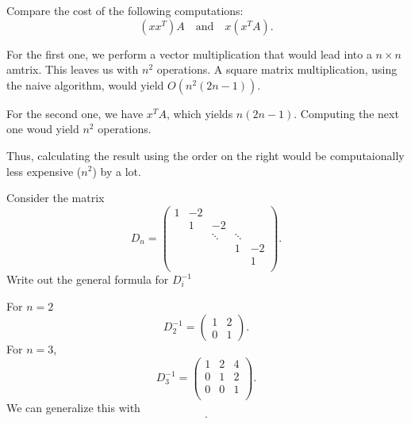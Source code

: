\documentclass[5pt, a4paper]{article}
\begin{document}
\begin{tcolorbox}[title=Question 1]
    Compare the cost of the following computations: \[
        (x x^{T})A \quad \text{and} \quad x(x^{T}A)
    .\] 
\end{tcolorbox}
For the first one, we perform a vector multiplication that would lead into a $n
\times n$ amtrix. This leaves us with $n^2$ operations. A square matrix
multiplication, using the naive algorithm, would yield $O(n^2(2n-1))$.

For the second one, we have $x^{T}A$, which yields $n(2n - 1)$. Computing the
next one woud yield $n^2$ operations. 

Thus, calculating the result using the order on the right would be
computaionally less expensive ($n^2$) by a lot.
\begin{tcolorbox}[title=Question 2]
    Consider the matrix \[
        D_n =
   \begin{pmatrix} 
       1 & -2 &  & &  \\
        & 1 & -2 & &  \\
        &  & \ddots & \ddots &  \\
        &  & & 1 & -2 \\
        &  & &  & 1 \\
   \end{pmatrix}  
    .\] 
    Write out the general formula for $D_i^{-1}$
\end{tcolorbox}
For $n = 2$
 \[
     D_2^{-1} = \begin{pmatrix} 1 & 2 \\ 0 & 1 \end{pmatrix} 
.\] 
For $n = 3$,
 \[
D_3^{-1} = 
\begin{pmatrix}  
    1 & 2 & 4 \\ 
    0 & 1 & 2 \\
    0 & 0 & 1 \\
\end{pmatrix} 
.\] 
We can generalize this with \[

.\] 

\begin{tcolorbox}[title=Question 3]
\end{tcolorbox}
\begin{tcolorbox}[title=Question 4]
\end{tcolorbox}
\begin{tcolorbox}[title=Question 5]
\end{tcolorbox}
\begin{tcolorbox}[title=Question 6]
\end{tcolorbox}
\begin{tcolorbox}[title=Question 7]
\end{tcolorbox}
\end{document}
